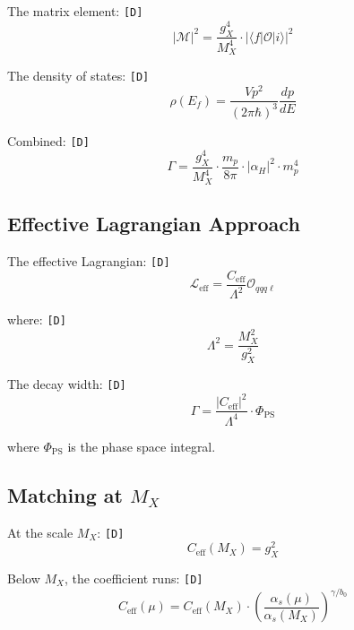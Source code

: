 \documentclass[11pt,a4paper]{article}
\newcommand{\tagD}{\textcolor{green!50!black}{\texttt{[D]}}}
\theoremstyle{definition}
\begin{document}
The matrix element: \tagD{}
\begin{equation}
\label{eq:matrix-element}
|\mathcal{M}|^2 = \frac{g_X^4}{M_X^4} \cdot |\langle f | \mathcal{O} | i \rangle|^2
\end{equation}

The density of states: \tagD{}
\begin{equation}
\label{eq:density-states}
\rho(E_f) = \frac{V p^2}{(2\pi\hbar)^3} \frac{dp}{dE}
\end{equation}

Combined: \tagD{}
\begin{equation}
\label{eq:rate-combined}
\Gamma = \frac{g_X^4}{M_X^4} \cdot \frac{m_p}{8\pi} \cdot |\alpha_H|^2 \cdot m_p^4
\end{equation}

\subsection{Effective Lagrangian Approach}
\label{app:eft-approach}

The effective Lagrangian: \tagD{}
\begin{equation}
\label{eq:eff-lag}
\mathcal{L}_{\text{eff}} = \frac{C_{\text{eff}}}{\Lambda^2} \mathcal{O}_{qqq\ell}
\end{equation}

where: \tagD{}
\begin{equation}
\label{eq:lambda-eff}
\Lambda^2 = \frac{M_X^2}{g_X^2}
\end{equation}

The decay width: \tagD{}
\begin{equation}
\label{eq:width-eft}
\Gamma = \frac{|C_{\text{eff}}|^2}{\Lambda^4} \cdot \Phi_{\text{PS}}
\end{equation}

where $\Phi_{\text{PS}}$ is the phase space integral.

\subsection{Matching at $M_X$}
\label{app:matching}

At the scale $M_X$: \tagD{}
\begin{equation}
\label{eq:matching-condition}
C_{\text{eff}}(M_X) = g_X^2
\end{equation}

Below $M_X$, the coefficient runs: \tagD{}
\begin{equation}
\label{eq:running-coeff}
C_{\text{eff}}(\mu) = C_{\text{eff}}(M_X) \cdot \left(\frac{\alpha_s(\mu)}{\alpha_s(M_X)}\right)^{\gamma/b_0}
\end{equation}
\end{document}
